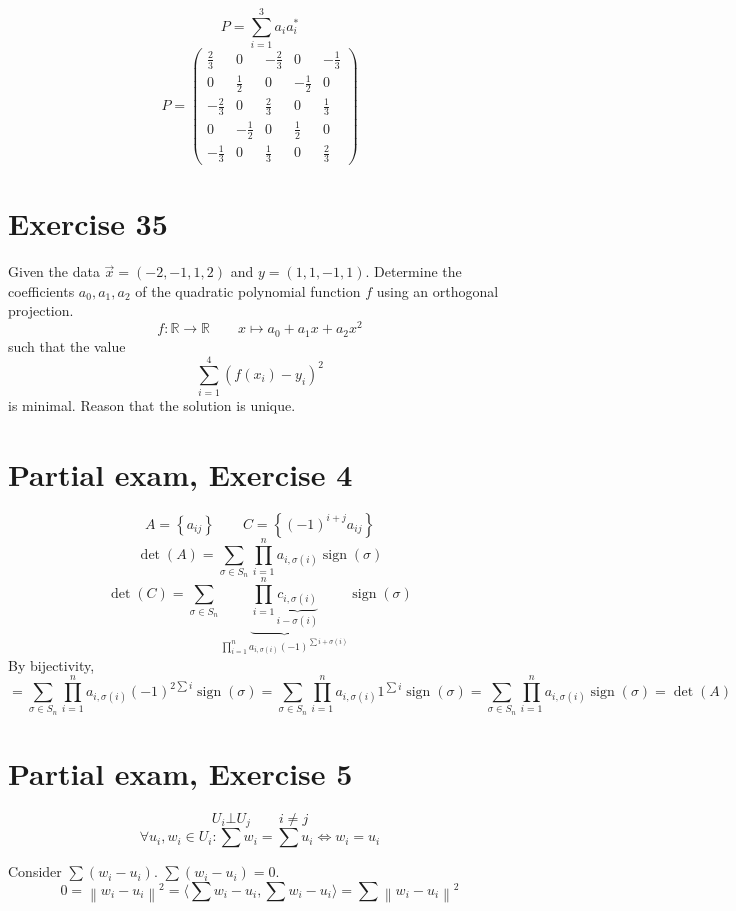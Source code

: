 \documentclass[a4paper]{article}
\theoremstyle{definition}
\DeclareMathOperator\sign{sign}
\newcommand\set[1]{\left\{#1\right\}}
\newcommand\ip[2]{\langle{#1},{#2}\rangle}
\newcommand\norm[1]{\left\|{#1}\right\|}
\begin{document}
\[ P = \sum_{i=1}^3 a_i a_i^* \]
\[
  P = \begin{pmatrix}
    \frac23 & 0 & -\frac23 & 0 & -\frac13 \\
    0 & \frac12 & 0 & -\frac12 & 0 \\
    -\frac23 & 0 & \frac23 & 0 & \frac13 \\
    0 & -\frac12 & 0 & \frac12 & 0 \\
    -\frac13 & 0 &\frac13 & 0 & \frac23
  \end{pmatrix}
\]


\section*{Exercise 35}
\begin{ex}
  Given the data $\vec x = (-2, -1, 1, 2)$ and $y = (1,1,-1, 1)$. Determine the coefficients $a_0, a_1, a_2$ of the quadratic polynomial function $f$ using an orthogonal projection.
  \[ f: \mathbb R \to \mathbb R \qquad x \mapsto a_0 + a_1 x + a_2 x^2 \]
  such that the value
  \[ \sum_{i=1}^4 (f(x_i) - y_i)^2 \]
  is minimal. Reason that the solution is unique.
\end{ex}

\section*{Partial exam, Exercise 4}

\[ A= \set{a_{ij}} \qquad C = \set{(-1)^{i+j}a_{ij}} \]
\[ \det(A) = \sum_{\sigma \in S_n} \prod_{i=1}^n a_{i, \sigma(i)} \operatorname{sign}(\sigma) \]
\[ \det(C) = \sum_{\sigma \in S_n} \underbrace{\prod_{i=1}^n \underbrace{c_{i,\sigma(i)}}_{i-\sigma(i)}}_{\prod_{i=1}^n a_{i,\sigma(i)} (-1)^{\sum i + \sigma(i)}} \operatorname{sign}(\sigma) \]
By bijectivity,
\[ = \sum_{\sigma \in S_n} \prod_{i=1}^n a_{i,\sigma(i)} (-1)^{2 \sum i} \sign(\sigma) = \sum_{\sigma \in S_n} \prod_{i=1}^n a_{i,\sigma(i)} 1^{\sum i} \sign(\sigma) = \sum_{\sigma \in S_n} \prod_{i=1}^n a_{i,\sigma(i)} \sign(\sigma) = \det(A) \]

\section*{Partial exam, Exercise 5}

\[ U_i \bot U_j \qquad i \neq j \]
\[ \forall u_i, w_i \in U_i: \sum w_i = \sum u_i \iff w_i = u_i \]

Consider $\sum (w_i - u_i)$. $\sum (w_i - u_i) = 0$.
\[ 0 = \norm{w_i - u_i}^2 = \ip{\sum w_i - u_i}{\sum w_i - u_i} = \sum \norm{w_i - u_i}^2 \]
\end{document}
